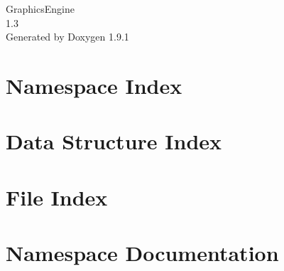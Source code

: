\let\mypdfximage\pdfximage\def\pdfximage{\immediate\mypdfximage}\documentclass[twoside]{book}
\newcommand{\+}{\discretionary{\mbox{\scriptsize$\hookleftarrow$}}{}{}}
\newcommand{\clearemptydoublepage}{%
  \newpage{\pagestyle{empty}\cleardoublepage}%
}
\begin{document}
\raggedbottom

\hypersetup{pageanchor=false,
             bookmarksnumbered=true,
             pdfencoding=unicode
            }
\begin{titlepage}
\vspace*{7cm}
\begin{center}%
{\Large Graphics\+Engine \\[1ex]\large 1.\+3 }\\
\vspace*{1cm}
{\large Generated by Doxygen 1.9.1}\\
\end{center}
\end{titlepage}
\clearemptydoublepage
{}
\tableofcontents
\clearemptydoublepage
{}
\hypersetup{pageanchor=true}

\chapter{Namespace Index}

\chapter{Data Structure Index}

\chapter{File Index}

\chapter{Namespace Documentation}




\end{document}
